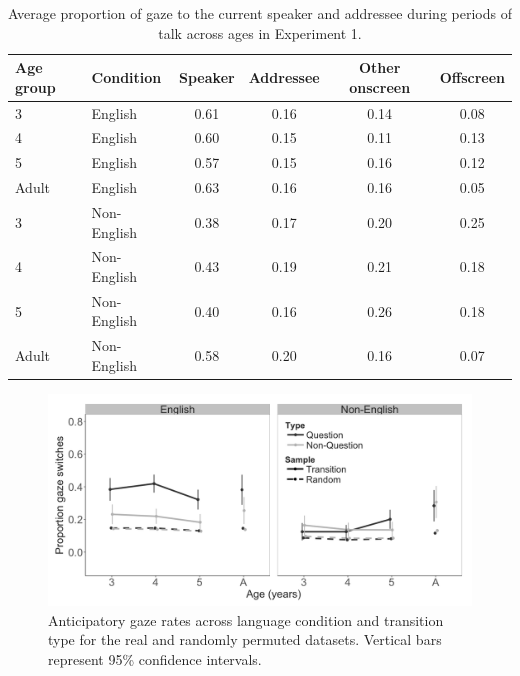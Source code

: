 \documentclass[authoryear, 12pt]{elsarticle}
\begin{document}
\linespread{1}
\begin{table}[t]
\begin{center}
  \begin{tabular}{llcccc}
    \hline
    Age group & Condition & Speaker & Addressee & Other onscreen & Offscreen\\
    \hline
    3 & English & 0.61 & 0.16 & 0.14 & 0.08 \\
    4 & English & 0.60 & 0.15 & 0.11 & 0.13 \\
    5 & English & 0.57 & 0.15 & 0.16 & 0.12 \\
    Adult & English & 0.63 & 0.16 & 0.16 & 0.05 \\
    3 & Non-English & 0.38 & 0.17 & 0.20 & 0.25 \\
    4 & Non-English & 0.43 & 0.19 & 0.21 & 0.18 \\
    5 & Non-English & 0.40 & 0.16 & 0.26 & 0.18 \\
    Adult & Non-English & 0.58 & 0.20 & 0.16 & 0.07 \\
    \hline
  \end{tabular}
\end{center}
  \caption{Average proportion of gaze to the current speaker and addressee during periods of talk across ages in Experiment 1.}
\label{tab:e1_look}
\end{table}

\begin{figure}[h]
\begin{center}
\includegraphics[width=1\textwidth]{figures/E1-samples-by-lang-groups-trans-types.png}
\end{center}
\caption{Anticipatory gaze rates across language condition and transition type for the real and randomly permuted datasets. Vertical bars represent 95\% confidence intervals.}
\label{fig:E1-randvsreal}
\end{figure}
\end{document}
